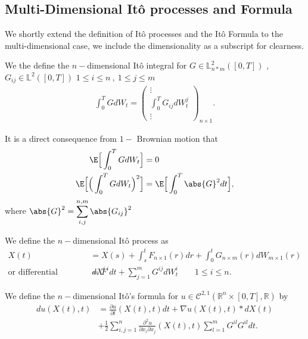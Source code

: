 \subsection{Multi-Dimensional It\^o processes and Formula}
We shortly extend the definition of It\^o processes and the It\^o Formula to the multi-dimensional case, we
include the dimensionality as a subscript for clearness.
\begin{definition}
  We the define the $n-$dimensional It\^o integral for $G \in  \mathbb{L}^{2}_{n*m}([0,T]) $ , $G_{ij} \in  \mathbb{L}^{2}([0,T])$ $1\le i\le n \ , \ 1 \le j \le m$
  \begin{align*}
    \int_0^{T} G d W_t = \begin{pmatrix} \vdots \\ \int_0^{T} G_{ij} d W^{j}_t \\ \vdots    \end{pmatrix}_{n \times 1}
  .\end{align*}
\end{definition}
\begin{remark} It is a direct consequence from $1-$ Brownian motion that
  \begin{align*}
    \E\Big[\int_0^{T} G dW_t \Big] &= 0  \\
    \E\Big[\Big(\int_0^{T} G dW_t \Big)^2\Big] &= \E\Big[\int_0^{T} \abs{G}^2 dt \Big]
  ,\end{align*}
  where $\displaystyle\abs{G}^2 = \sum_{i,j}^{n,m} \abs{G_{ij}}^2 $ 
\end{remark}  
\begin{definition}
 We define the $n-$dimensional It\^o process as  
 \begin{align*}
   X(t) &= X(s) + \int_s^{t} F_{n \times  1}(r) dr   + \int_0^{t} G_{n \times  m}(r) dW_{m \times  1}(r)  \\
\mbox{or differential version }\quad   dX^{i} &= F^{i} dt + \sum_{j=1}^{m} G^{ij} dW_t^i      \qquad 1\le i \le n
 .\end{align*}
\end{definition}
\begin{theorem}
  We define the $n-$dimensional It\^o's formula for $u \in  \mathcal{C}^{2,1}(\mathbb{R}^{n} \times [0,T],\mathbb{R} ) $ by 
  \begin{align*}
    du(X(t),t) &= \frac{\partial u}{\partial t}(X(t),t) dt + \nabla u(X(t),t) * dX(t) \\
               &+ \frac{1}{2} \sum_{i,j=1}^n \frac{\partial ^2 u}{\partial x_i \partial x_j}(X(t),t) \sum_{l=1}^{m}  G^{il} G^{il}dt 
  .\end{align*}
\end{theorem}
